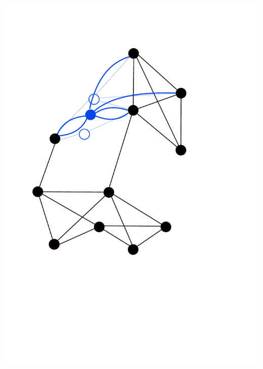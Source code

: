 \documentclass[titlepage,german,presentation]{beamer}
\begin{document}
\begin{frame}
\includegraphics[height=0.6\textheight]{min-cut-5.pdf} 

\end{frame}
\end{document}
